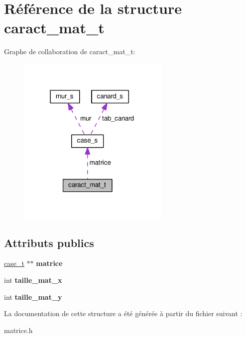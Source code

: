 \hypertarget{structcaract__mat__t}{}\section{Référence de la structure caract\+\_\+mat\+\_\+t}
\label{structcaract__mat__t}


Graphe de collaboration de caract\+\_\+mat\+\_\+t\+:
\nopagebreak
\begin{figure}[H]
\begin{center}
\leavevmode
\includegraphics[width=207pt]{structcaract__mat__t__coll__graph}
\end{center}
\end{figure}
\subsection*{Attributs publics}
\begin{DoxyCompactItemize}
\item 
\hyperlink{structcase__s}{case\+\_\+t} $\ast$$\ast$ {\bfseries matrice}\hypertarget{structcaract__mat__t_aa3569a2f1b929270f199d67ba5e69e22}{}\label{structcaract__mat__t_aa3569a2f1b929270f199d67ba5e69e22}

\item 
int {\bfseries taille\+\_\+mat\+\_\+x}\hypertarget{structcaract__mat__t_a2cb8eefb38e1c69b0972af2757a56fbe}{}\label{structcaract__mat__t_a2cb8eefb38e1c69b0972af2757a56fbe}

\item 
int {\bfseries taille\+\_\+mat\+\_\+y}\hypertarget{structcaract__mat__t_a84ff012cb096bc4faf26947077ed8450}{}\label{structcaract__mat__t_a84ff012cb096bc4faf26947077ed8450}

\end{DoxyCompactItemize}


La documentation de cette structure a été générée à partir du fichier suivant \+:\begin{DoxyCompactItemize}
\item 
matrice.\+h\end{DoxyCompactItemize}
